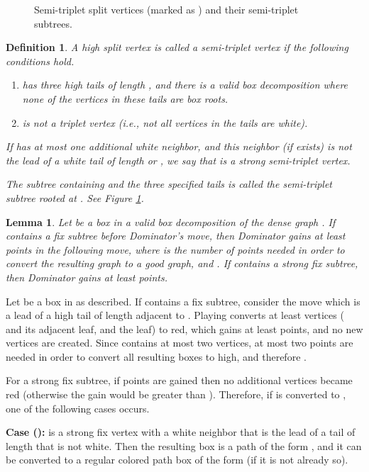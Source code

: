\documentclass[11pt]{article}
\def\Proof{\par\noindent{\bf Proof:~}}
\def\dnsitem{\vspace{-7pt}\item}
\newtheorem{definition}[theorem]{Definition}
\newtheorem{lemma}[theorem]{Lemma}
\theoremstyle{definition}
\begin{document}
\begin{figure}[thbp]
  \caption{\sf Semi-triplet split vertices (marked as ) and their semi-triplet subtrees.}
  \medskip
  \centering
  \label{fig:semi_triplet_split}
\end{figure}
\begin{definition}
A high split vertex  is called a \emph{semi-triplet} vertex if the following conditions hold. 
\begin{enumerate}
	\dnsitem  has three high tails of length , and there is a valid box decomposition where none of the vertices in these tails are box roots. 
	\dnsitem  is not a triplet vertex (i.e., not all vertices in the tails are white).
\end{enumerate}

If  has at most one additional white neighbor, and this neighbor (if exists) is not the lead of a white tail of length  or , 
we say that  is a \emph{strong semi-triplet} vertex.

The subtree containing  and the three specified tails is called the \emph{semi-triplet subtree rooted at }. 
See Figure \ref{fig:semi_triplet_split}.
\end{definition}


\begin{lemma}
\label{lemma:fix_subtree_gain}
Let  be a box in a valid box decomposition of the dense graph .
If  contains a fix subtree before Dominator's move, then Dominator gains at least  points in the following move, 
where  is the number of points needed in order to convert the resulting graph to a good graph, and .
If  contains a strong fix subtree, then Dominator gains at least  points.
\end{lemma}
\Proof
Let  be a box in  as described.
If  contains a fix subtree, consider the move  which is a lead of a high tail of length  adjacent to .
Playing  converts at least  vertices ( and its adjacent leaf, and the  leaf) to red, 
which gains at least  points, and no new  vertices are created.
Since  contains at most two  vertices, at most two points 
are needed in order to convert all resulting boxes to high, and therefore .

For a strong fix subtree, if  points are gained then no additional vertices became red (otherwise the gain would be greater than ). 
Therefore, if  is converted to , one of the following cases occurs.

\smallskip
\par\noindent
{\bf Case ():}
 is a strong fix vertex with a white neighbor that is the lead of a tail of length  that is not white. 
Then the resulting box is a path of the form , and it can be converted to a regular colored path box of the form  (if it is not already so).
\end{document}
